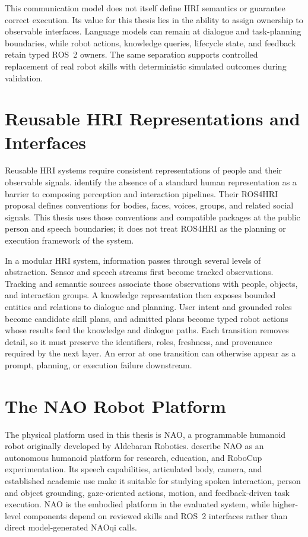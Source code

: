 This communication model does not itself define HRI semantics or guarantee correct execution. Its value for this thesis lies in the ability to assign ownership to observable interfaces. Language models can remain at dialogue and task-planning boundaries, while robot actions, knowledge queries, lifecycle state, and feedback retain typed ROS~2 owners. The same separation supports controlled replacement of real robot skills with deterministic simulated outcomes during validation.

\section{Reusable HRI Representations and Interfaces}

Reusable HRI systems require consistent representations of people and their observable signals. \textcite{mohamed2020ros4hri} identify the absence of a standard human representation as a barrier to composing perception and interaction pipelines. Their ROS4HRI proposal defines conventions for bodies, faces, voices, groups, and related social signals. This thesis uses those conventions and compatible packages at the public person and speech boundaries; it does not treat ROS4HRI as the planning or execution framework of the system.

In a modular HRI system, information passes through several levels of abstraction. Sensor and speech streams first become tracked observations. Tracking and semantic sources associate those observations with people, objects, and interaction groups. A knowledge representation then exposes bounded entities and relations to dialogue and planning. User intent and grounded roles become candidate skill plans, and admitted plans become typed robot actions whose results feed the knowledge and dialogue paths. Each transition removes detail, so it must preserve the identifiers, roles, freshness, and provenance required by the next layer. An error at one transition can otherwise appear as a prompt, planning, or execution failure downstream.

\section{The NAO Robot Platform}

The physical platform used in this thesis is NAO, a programmable humanoid robot originally developed by Aldebaran Robotics. \textcite{gouaillier2008nao} describe NAO as an autonomous humanoid platform for research, education, and RoboCup experimentation. Its speech capabilities, articulated body, camera, and established academic use make it suitable for studying spoken interaction, person and object grounding, gaze-oriented actions, motion, and feedback-driven task execution. NAO is the embodied platform in the evaluated system, while higher-level components depend on reviewed skills and ROS~2 interfaces rather than direct model-generated NAOqi calls.

